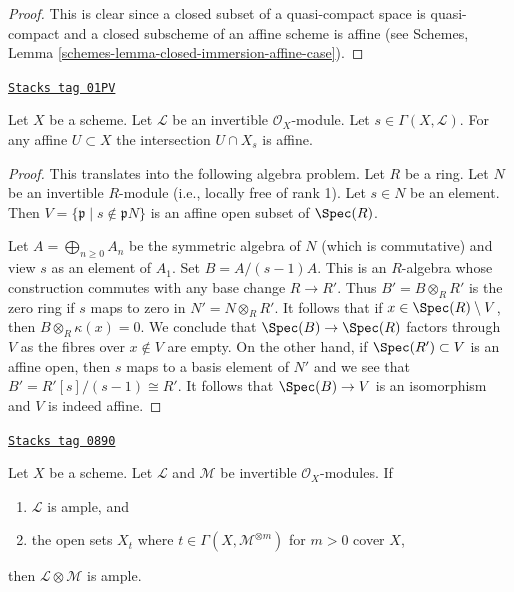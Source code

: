 \begin{proof}
This is clear since a closed subset of a quasi-compact space is quasi-compact
and a closed subscheme of an affine scheme is affine (see
Schemes, Lemma \ref{schemes-lemma-closed-immersion-affine-case}).
\end{proof}

\begin{lemma}
\label{properties-lemma-affine-cap-s-open}
\href{https://stacks.math.columbia.edu/tag/01PV}{\texttt{Stacks tag 01PV}}

Let $X$ be a scheme. Let $\mathcal{L}$ be an invertible $\mathcal{O}_X$-module.
Let $s \in \Gamma(X, \mathcal{L})$. For any affine $U \subset X$
the intersection $U \cap X_s$ is affine.
\end{lemma}

\begin{proof}
This translates into the following algebra problem.
Let $R$ be a ring. Let $N$ be an invertible $R$-module
(i.e., locally free of rank 1). Let $s \in N$ be an element.
Then $V = \{\mathfrak p \mid s \not \in \mathfrak p N\}$ is
an affine open subset of $\Spec(R)$.

\medskip\noindent
Let $A = \bigoplus_{n \geq 0} A_n$ be the symmetric algebra of $N$
(which is commutative) and view $s$ as an element of $A_1$.
Set $B = A/(s - 1)A$. This is an $R$-algebra whose construction
commutes with any base change $R \to R'$. Thus $B' = B \otimes_R R'$
is the zero ring if $s$ maps to zero in $N' = N \otimes_R R'$. It
follows that if $x \in \Spec(R) \setminus V$, then $B \otimes_R \kappa(x) = 0$.
We conclude that $\Spec(B) \to \Spec(R)$ factors through $V$ as the
fibres over $x \not \in V$ are empty. On the other hand, if
$\Spec(R') \subset V$ is an affine open, then $s$ maps to a basis
element of $N'$ and we see that $B' = R'[s]/(s - 1) \cong R'$.
It follows that $\Spec(B) \to V$ is an isomorphism and $V$ is
indeed affine.
\end{proof}

\begin{lemma}
\label{properties-lemma-ample-tensor-globally-generated}
\href{https://stacks.math.columbia.edu/tag/0890}{\texttt{Stacks tag 0890}}

\begin{reference}
\cite[II Proposition 4.5.6(ii)]{EGA}
\end{reference}
Let $X$ be a scheme. Let $\mathcal{L}$ and $\mathcal{M}$
be invertible $\mathcal{O}_X$-modules. If
\begin{enumerate}
\item $\mathcal{L}$ is ample, and
\item the open sets $X_t$ where $t \in \Gamma(X, \mathcal{M}^{\otimes m})$
for $m > 0$ cover $X$,
\end{enumerate}
then $\mathcal{L} \otimes \mathcal{M}$ is ample.
\end{lemma}

